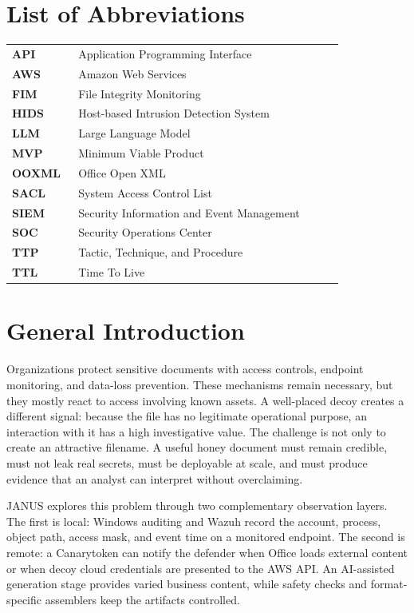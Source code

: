 \documentclass{rapportENSIAS}
\begin{document}
\chapter*{List of Abbreviations}
\begin{longtable}{>{\bfseries}p{0.18\linewidth}p{0.72\linewidth}}
API & Application Programming Interface \\
AWS & Amazon Web Services \\
FIM & File Integrity Monitoring \\
HIDS & Host-based Intrusion Detection System \\
LLM & Large Language Model \\
MVP & Minimum Viable Product \\
OOXML & Office Open XML \\
SACL & System Access Control List \\
SIEM & Security Information and Event Management \\
SOC & Security Operations Center \\
TTP & Tactic, Technique, and Procedure \\
TTL & Time To Live \\
\end{longtable}

\clearpage
\tabledematieres
\listoffigures
\clearpage
\listoftables
\clearpage

\chapter*{General Introduction}
Organizations protect sensitive documents with access controls, endpoint
monitoring, and data-loss prevention. These mechanisms remain necessary, but
they mostly react to access involving known assets. A well-placed decoy creates
a different signal: because the file has no legitimate operational purpose,
an interaction with it has a high investigative value. The challenge is not
only to create an attractive filename. A useful honey document must remain
credible, must not leak real secrets, must be deployable at scale, and must
produce evidence that an analyst can interpret without overclaiming.

JANUS explores this problem through two complementary observation layers. The
first is local: Windows auditing and Wazuh record the account, process, object
path, access mask, and event time on a monitored endpoint. The second is
remote: a Canarytoken can notify the defender when Office loads external
content or when decoy cloud credentials are presented to the AWS API. An
AI-assisted generation stage provides varied business content, while safety
checks and format-specific assemblers keep the artifacts controlled.
\end{document}
